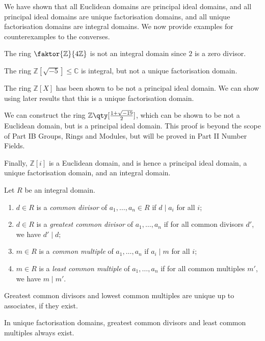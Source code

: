 \begin{example}
	We have shown that all Euclidean domains are principal ideal domains, and all principal ideal domains are unique factorisation domains, and all unique factorisation domains are integral domains.
	We now provide examples for counterexamples to the converses.

	The ring $\faktor{\mathbb Z}{4\mathbb Z}$ is not an integral domain since $2$ is a zero divisor.

	The ring $\mathbb Z[\sqrt{-5}] \leq \mathbb C$ is integral, but not a unique factorisation domain.

	The ring $\mathbb Z[X]$ has been shown to be not a principal ideal domain.
	We can show using later results that this is a unique factorisation domain.

	We can construct the ring $\mathbb Z\qty[\frac{1+\sqrt{-19}}{2}]$, which can be shown to be not a Euclidean domain, but is a principal ideal domain.
	This proof is beyond the scope of Part IB Groups, Rings and Modules, but will be proved in Part II Number Fields.

	Finally, $\mathbb Z[i]$ is a Euclidean domain, and is hence a principal ideal domain, a unique factorisation domain, and an integral domain.
\end{example}
\begin{definition}
	Let $R$ be an integral domain.
	\begin{enumerate}
		\item $d \in R$ is a \textit{common divisor} of $a_1, \dots, a_n \in R$ if $d \mid a_i$ for all $i$;
		\item $d \in R$ is a \textit{greatest common divisor} of $a_1, \dots, a_n$ if for all common divisors $d'$, we have $d' \mid d$;
		\item $m \in R$ is a \textit{common multiple} of $a_1, \dots, a_n$ if $a_i \mid m$ for all $i$;
		\item $m \in R$ is a \textit{least common multiple} of $a_1, \dots, a_n$ if for all common multiples $m'$, we have $m \mid m'$.
	\end{enumerate}
\end{definition}
\begin{remark}
	Greatest common divisors and lowest common multiples are unique up to associates, if they exist.
\end{remark}
\begin{proposition}
	In unique factorisation domains, greatest common divisors and least common multiples always exist.
\end{proposition}
